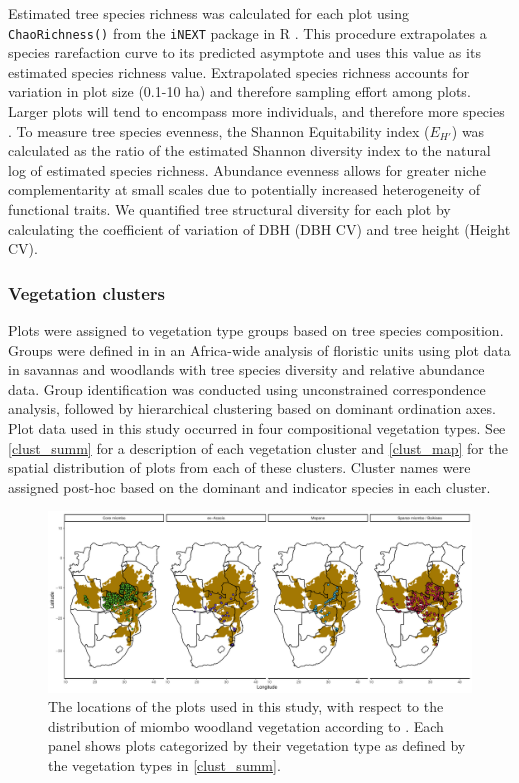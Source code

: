\documentclass[11pt,a4paper]{article}
\begin{document}
Estimated tree species richness was calculated for each plot using \verb|ChaoRichness()| from the \verb|iNEXT| package in R \citep{Hsieh2016}. This procedure extrapolates a species rarefaction curve to its predicted asymptote and uses this value as its estimated species richness value. Extrapolated species richness accounts for variation in plot size (0.1-10 ha) and therefore sampling effort among plots. Larger plots will tend to encompass more individuals, and therefore more species \citep{Dengler2009}. To measure tree species  evenness, the Shannon Equitability index ($E_{H'}$) \citep{Smith1996} was calculated as the ratio of the estimated Shannon diversity index to the natural log of estimated species richness. Abundance evenness allows for greater niche complementarity at small scales due to potentially increased heterogeneity of functional traits. We quantified tree structural diversity for each plot by calculating the coefficient of variation of DBH (DBH CV) and tree height (Height CV). 

\subsubsection{Vegetation clusters}

Plots were assigned to vegetation type groups based on tree species composition. Groups were defined in \citet{Fayolle2018} in an Africa-wide analysis of floristic units using plot data in savannas and woodlands with tree species diversity and relative abundance data. Group identification was conducted using unconstrained correspondence analysis, followed by hierarchical clustering based on dominant ordination axes. Plot data used in this study occurred in four compositional vegetation types. See \autoref{clust_summ} for a description of each vegetation cluster and \autoref{clust_map} for the spatial distribution of plots from each of these clusters. Cluster names were assigned post-hoc based on the dominant and indicator species in each cluster.

\begin{landscape}


\begin{figure}[H]
\centering
	\includegraphics[width=1.4\textwidth]{clust_map}
	\caption{The locations of the \nplots{} plots used in this study, with respect to the distribution of miombo woodland vegetation according to \citet{White1987}. Each panel shows plots categorized by their vegetation type as defined by the vegetation types in \autoref{clust_summ}.}
	\label{clust_map}
\end{figure}
\end{landscape}
\end{document}

